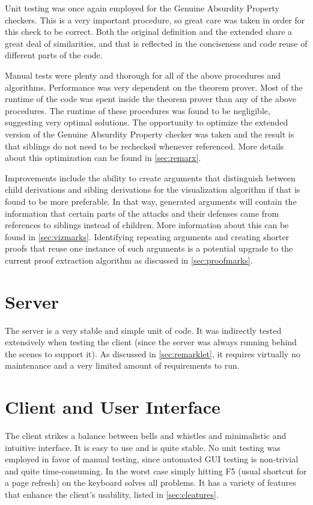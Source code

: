\documentclass[11pt,twoside,a4paper]{report}
\begin{document}
Unit testing was once again employed for the Genuine Absurdity Property checkers. This is a very important procedure, so great care was taken in order for this check to be correct. Both the original definition and the extended share a great deal of similarities, and that is reflected in the conciseness and code reuse of different parts of the code.

Manual tests were plenty and thorough for all of the above procedures and algorithms. Performance was very dependent on the theorem prover. Most of the runtime of the code was spent inside the theorem prover than any of the above procedures. The runtime of these procedures was found to be negligible, suggesting very optimal solutions. The opportunity to optimize the extended version of the Genuine Absurdity Property checker was taken and the result is that siblings do not need to be rechecked whenever referenced. More details about this optimization can be found in \autoref{sec:remarx}.

Improvements include the ability to create arguments that distinguish between child derivations and sibling derivations for the visualization algorithm if that is found to be more preferable. In that way, generated arguments will contain the information that certain parts of the attacks and their defenses came from references to siblings instead of children. More information about this can be found in \autoref{sec:vizmarks}. Identifying repeating arguments and creating shorter proofs that reuse one instance of such arguments is a potential upgrade to the current proof extraction algorithm as discussed in \autoref{sec:proofmarks}.

\section{Server}
The server is a very stable and simple unit of code. It was indirectly tested extensively when testing the client (since the server was always running behind the scenes to support it). As discussed in \autoref{sec:remarklet}, it requires virtually no maintenance and a very limited amount of requirements to run.

\section{Client and User Interface}
The client strikes a balance between bells and whistles and minimalistic and intuitive interface. It is easy to use and is quite stable. No unit testing was employed in favor of manual testing, since automated GUI testing is non-trivial and quite time-consuming. In the worst case simply hitting F5 (usual shortcut for a page refresh) on the keyboard solves all problems. It has a variety of features that enhance the client's usability, listed in \autoref{sec:cleatures}.
\end{document}
